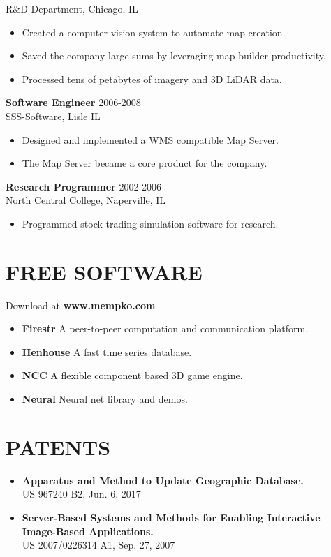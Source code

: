 \documentclass[line,margin]{res}
\begin{document}
\begin{resume}
                R\&D Department, Chicago, IL
                 \begin{itemize}  \itemsep -2pt %
                    \item Created a computer vision system to automate map creation.
                    \item Saved the company large sums by leveraging map builder productivity.
                    \item Processed tens of petabytes of imagery and 3D LiDAR data.
                \end{itemize}
                {\bf Software Engineer} \hfill  2006-2008 \\
                SSS-Software, Lisle IL
                 \begin{itemize}  \itemsep -2pt 
                    \item Designed and implemented a WMS compatible Map Server.
                    \item The Map Server became a core product for the company.
                 \end{itemize} 
                {\bf Research Programmer} \hfill 2002-2006 \\
                North Central College, Naperville, IL
                \begin{itemize} \itemsep -2pt 
                    \item Programmed stock trading simulation software for research.
                \end{itemize} 
\section{FREE SOFTWARE} Download at {\bf www.mempko.com} \\ 
                \begin{itemize} \itemsep -2pt 
                    \item {\bf Firestr} A peer-to-peer computation and communication platform.
                    \item {\bf Henhouse} A fast time series database.
                    \item {\bf NCC} A flexible component based 3D game engine.
                    \item {\bf Neural} Neural net library and demos.
                \end{itemize}
\section{PATENTS} 
            \begin{itemize} \itemsep -2pt 
                    \item {\bf Apparatus and Method to Update Geographic Database.} \\ US 967240 B2, Jun. 6, 2017
                    \item {\bf Server-Based Systems and Methods for Enabling Interactive Image-Based Applications.} \\ US 2007/0226314 A1, Sep. 27, 2007
            \end{itemize}

\end{resume}
\end{document}

